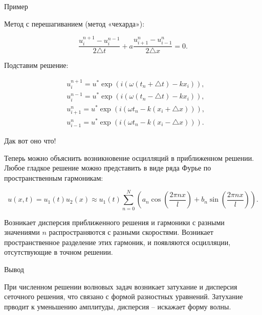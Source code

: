 \documentclass[10pt,xcolor=pst,aspectratio=169]{beamer}
\begin{document}
\begin{frame}{Пример}

	\transdissolve[duration=0.1]
	\justifying
	\large

	Метод с перешагиванием (метод «чехарда»):

	\[
		\frac{u^{n + 1}_{i} - u^{n - 1}_{i}}{2 \triangle t} + a \frac{u^{n}_{i + 1} - u^{n}_{i - 1}}{2 \triangle x} = 0 .
	\]

	Подставим решение:

	\[
		\begin{split}
			&u^{n + 1}_{i} = u^{*} \exp{(i (\omega (t_{n} + \triangle t) - k x_{i}))} , \\
			&u^{n - 1}_{i} = u^{*} \exp{(i (\omega (t_{n} - \triangle t) - k x_{i}))} , \\
			&u^{n}_{i + 1} = u^{*} \exp{(i (\omega t_{n} - k (x_{i} + \triangle x)))} , \\
			&u^{n}_{i - 1} = u^{*} \exp{(i (\omega t_{n} - k (x_{i} - \triangle x)))} .
			\end{split}
	\]

\end{frame}

\begin{frame}{Дак вот оно что!}

	\transdissolve[duration=0.1]
	\justifying
	\large

	Теперь можно объяснить возникновение осцилляций в приближенном решении. Любое гладкое решение можно представить в виде ряда Фурье по пространственным гармоникам:

	\[
		u(x, t) = u_{1}(t) u_{2}(x) \approx u_{1}(t) \sum^{N}_{n = 0} \left( a_{n} \cos \left( \frac{2 \pi n x}{l} \right) + b_{n} \sin \left( \frac{2 \pi n x}{l} \right) \right).
	\]

	Возникает дисперсия приближенного решения и гармоники с разными значениями $n$ распространяются с разными скоростями. Возникает пространственное разделение этих гармоник, и появляются осцилляции, отсутствующие в точном решении.

\end{frame}

\begin{frame}{Вывод}

	\transdissolve[duration=0.1]
	\justifying
	\large

	При численном решении волновых задач возникает затухание и дисперсия сеточного решения, что связано с формой разностных уравнений. Затухание прводит к уменьшению амплитуды, дисперсия -- искажает форму волны.

\end{frame}
\end{document}

